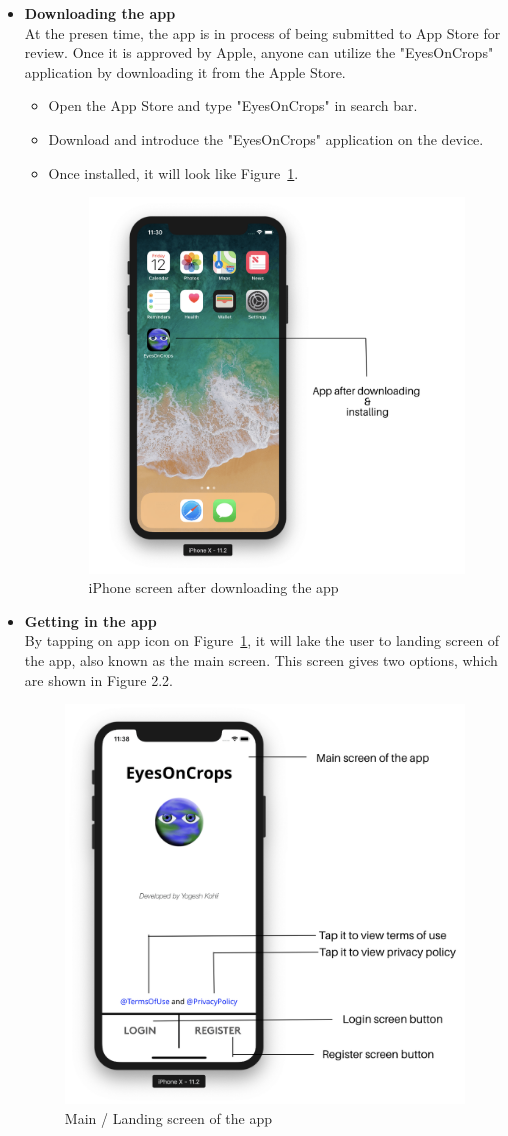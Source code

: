 \begin{itemize}
    \item \textbf{Downloading the app} \\
    At the presen time, the app is in process of being submitted to App Store for review. Once it is approved by Apple, anyone can utilize the "EyesOnCrops" application by downloading it from the Apple Store. 
    
    \begin{itemize}
        \item Open the App Store and type "EyesOnCrops" in search bar.
        \item Download and introduce the "EyesOnCrops" application on the device.
        \item Once installed, it will look like Figure~\ref{fig:app_icon_screen}.
        
        \begin{figure}[H]
            \centering
            \includegraphics[width=0.50\linewidth]{figures/ch2/app_icon_screen.png}
            \caption{\label{fig:app_icon_screen} iPhone screen after downloading the app}
        \end{figure}
    \end{itemize}
    
    \item \textbf{Getting in the app} \\
    By tapping on app icon on Figure~\ref{fig:app_icon_screen}, it will lake the user to landing screen of the app, also known as the main screen. This screen gives two options, which are shown in Figure 2.2.
     
        \begin{figure}[H]
            \centering
            \includegraphics[width=0.50\linewidth]{figures/ch2/main_screen.png}
            \caption{\label{fig:main_screen} Main / Landing screen of the app}
        \end{figure}


\end{itemize}

